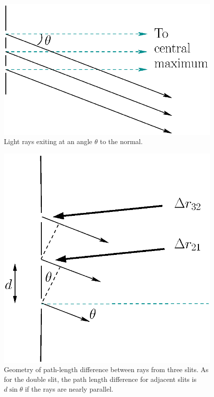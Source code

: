 \begin{figure}\begin{center}
 \includegraphics[width=2.0truein]{phasors/phasor18} 
\caption{\label{fig:phasor18}Light rays exiting at an angle $\theta$ to
the normal.}
\end{center}
\end{figure}


\begin{figure}\begin{center}
 \includegraphics[width=2.0truein]{phasors/phasor19} 
\caption{\label{fig:phasor19}Geometry of path-length difference
between rays from three slits. As for the double slit, the path length
difference for adjacent slits is $d\sin\theta$ if the rays are nearly parallel.}
\end{center}
\end{figure}

